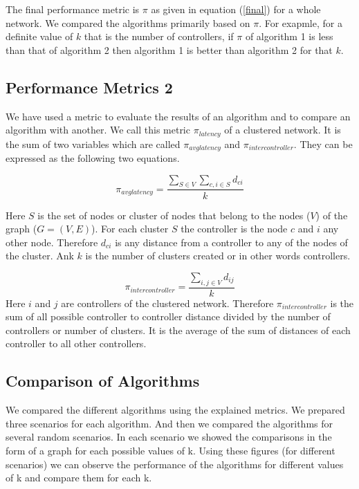 \documentclass[10pt]{extarticle}
\begin{document}
	The final performance metric is $\pi$ as given in equation (\ref{final}) for a whole network. We compared the algorithms primarily based on $\pi$. For exapmle, for a definite value of $k$ that is the number of controllers, if $\pi$ of algorithm 1 is less than that of algorithm 2 then algorithm 1 is better than algorithm 2 for that $k$.
	
	\subsection{Performance Metrics 2} \label{myperfm}
	We have used a metric to evaluate the results of an algorithm and to compare an algorithm with another. We call this metric $\pi_{latency}$ of a clustered network. It is the sum of two variables which are called $\pi_{avglatency}$ and $\pi_{intercontroller}$. They can be expressed as the following two equations.
	
	\begin{equation}
	\pi_{avglatency}=\frac{\sum_{S\in V}\sum_{c,i\in S}d_{ci}}{k}
	\end{equation}
	
	Here $S$ is the set of nodes or cluster of nodes that belong to the nodes ($V$) of the graph ($G=(V,E)$). For each cluster $S$ the controller is the node $c$ and $i$ any other node. Therefore $d_{ci}$ is any distance from a controller to any of the nodes of the cluster. Ank $k$ is the number of clusters created or in other words controllers.
	
	\begin{equation}
	\pi_{intercontroller}=\frac{\sum_{i,j\in V}d_{ij}}{k}
	\end{equation}
	Here $i$ and $j$ are controllers of the clustered network. Therefore $\pi_{intercontroller}$ is the sum of all possible controller to controller distance divided by the number of controllers or number of clusters. It is the average of the sum of distances of each controller to all other controllers.
	
	\subsection{Comparison of Algorithms} \label{comp}
	
	We compared the different algorithms using the explained metrics. We prepared three scenarios for each algorithm. And then we compared the algorithms for several random scenarios. In each scenario we showed the comparisons in the form of a graph for each possible values of k. Using these figures (for different scenarios) we can observe the performance of the algorithms for different values of k and compare them for each k.
	
\end{document}
